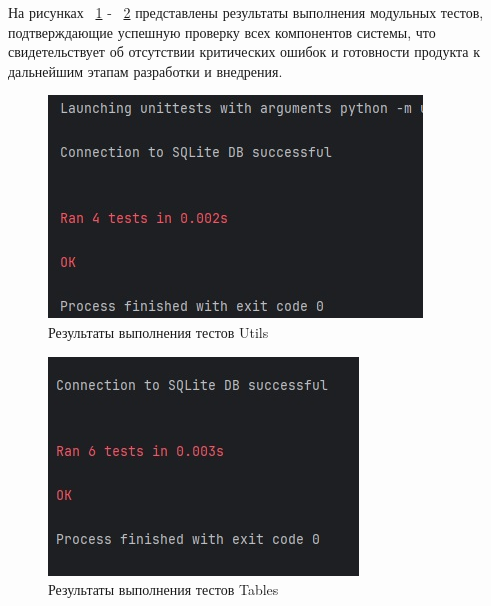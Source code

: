 На рисунках ~\ref{fig:test2} - ~\ref{fig:test3} представлены результаты выполнения модульных тестов, подтверждающие успешную проверку всех компонентов системы, что свидетельствует об отсутствии критических ошибок и готовности продукта к дальнейшим этапам разработки и внедрения.
\begin{figure}[H]
	\centering
	\includegraphics[width=1\linewidth]{images/test2}
	\caption{Результаты выполнения тестов Utils}
	\label{fig:test2}
\end{figure}

\begin{figure}[H]
	\centering
	\includegraphics[width=1\linewidth]{images/test3}
	\caption{Результаты выполнения тестов Tables}
	\label{fig:test3}
\end{figure}


